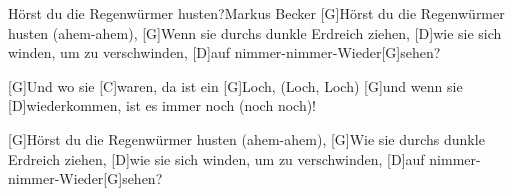 \documentclass[../main.tex]{subfiles}
\begin{document}
\begin{song}{Hörst du die Regenwürmer husten?}{Markus Becker}{}
[G]Hörst du die Regenwürmer husten (ahem-ahem),
[G]Wenn sie durchs dunkle Erdreich ziehen,
[D]wie sie sich winden, um zu verschwinden,
[D]auf nimmer-nimmer-Wieder[G]sehen?

[G]Und wo sie [C]waren, da ist ein [G]Loch, (Loch, Loch)
[G]und wenn sie [D]wiederkommen, ist es immer noch (noch noch)!

[G]Hörst du die Regenwürmer husten (ahem-ahem),
[G]Wie sie durchs dunkle Erdreich ziehen,
[D]wie sie sich winden, um zu verschwinden,
[D]auf nimmer-nimmer-Wieder[G]sehen?
\end{song}
\end{document}

